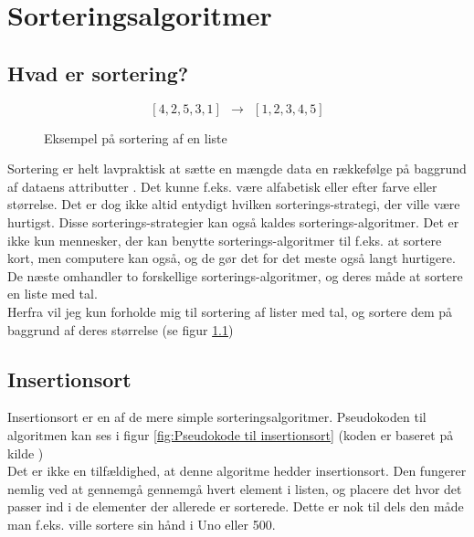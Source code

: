 \chapter{Sorteringsalgoritmer}
\label{ch:Sorteringsalgoritmer}

\section{Hvad er sortering?}
\label{sec:Hvad er sortering?}

\begin{figure}
	\begin{center}
		$$[4,2,5,3,1] \:\:\longrightarrow\:\: [1,2,3,4,5]$$
	\end{center}
	\caption{Eksempel på sortering af en liste}
	\label{fig:Eksempel på sortering af en liste}
\end{figure}


Sortering er helt lavpraktisk at sætte en mængde data en rækkefølge på baggrund af dataens attributter \cite{what-is-sorting}. Det kunne f.eks. være alfabetisk eller efter farve eller størrelse. Det er dog ikke altid entydigt hvilken sorterings-strategi, der ville være hurtigst. Disse sorterings-strategier kan også kaldes sorterings-algoritmer. Det er ikke kun mennesker, der kan benytte sorterings-algoritmer til f.eks. at sortere kort, men computere kan også, og de gør det for det meste også langt hurtigere. De næste  omhandler to forskellige sorterings-algoritmer, og deres måde at sortere en liste med tal.\\


Herfra vil jeg kun forholde mig til sortering af lister med tal, og sortere dem på baggrund af deres størrelse (se figur \ref{fig:Eksempel på sortering af en liste})


\section{Insertionsort}
\label{sec:Insertionsort}

Insertionsort er en af de mere simple sorteringsalgoritmer. Pseudokoden til algoritmen kan ses i figur \ref{fig:Pseudokode til insertionsort} (koden er baseret på kilde \cite[s. 104]{aogd})\\

Det er ikke en tilfældighed, at denne algoritme hedder insertionsort. Den fungerer nemlig ved at gennemgå gennemgå hvert element i listen, og placere det hvor det passer ind i de elementer der allerede er sorterede. Dette er nok til dels den måde man f.eks. ville sortere sin hånd i Uno eller 500. 

